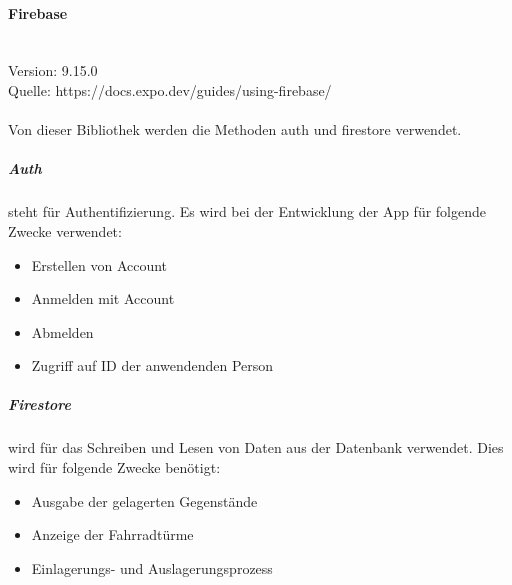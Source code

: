 \paragraph{Firebase}\mbox{}\\
Version: 9.15.0\\
Quelle: https://docs.expo.dev/guides/using-firebase/\\ \\
Von dieser Bibliothek werden die Methoden auth und firestore verwendet.
\subparagraph{Auth}steht für Authentifizierung. Es wird bei der Entwicklung der App für folgende Zwecke verwendet:
\begin{itemize}
  \item Erstellen von Account
  \item Anmelden mit Account
  \item Abmelden
  \item Zugriff auf ID der anwendenden Person
\end{itemize}

\subparagraph{Firestore}wird für das Schreiben und Lesen von Daten aus der Datenbank verwendet. Dies wird für folgende Zwecke benötigt:
\begin{itemize}
  \item Ausgabe der gelagerten Gegenstände
  \item Anzeige der Fahrradtürme
  \item Einlagerungs- und Auslagerungsprozess
\end{itemize}

